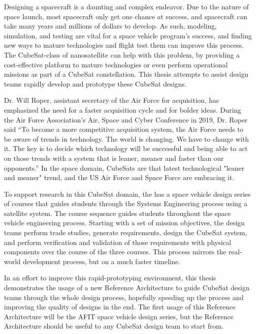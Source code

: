 Designing a spacecraft is a daunting and complex endeavor. Due to the nature of space launch, most spacecraft only get one chance at success, and spacecraft can take many years and millions of dollars to develop. As such, modeling, simulation, and testing are vital for a space vehicle program's success, and finding new ways to mature technologies and flight test them can improve this process. The CubeSat-class of nanosatellite can help with this problem, by providing a cost-effective platform to mature technologies or even perform operational missions as part of a CubeSat constellation. This thesis attempts to assist design teams rapidly develop and prototype these CubeSat designs. 

Dr. Will Roper, assistant secretary of the Air Force for acquisition, has emphasized the need for a faster acquisition cycle and for bolder ideas. During the Air Force Association’s Air, Space and Cyber Conference in 2019, Dr. Roper said “To become a more competitive acquisition system, the Air Force needs to be aware of trends in technology. The world is changing. We have to change with it. The key is to decide which technology will be successful and being able to act on those trends with a system that is leaner, meaner and faster than our opponents.” \citep{Roper2019} In the space domain, CubeSats are that latest technological "leaner and meaner" trend, and the US Air Force and Space Force are embracing it.

To support research in this CubeSat domain, the  has a space vehicle design series of courses that guides students through the Systems Engineering process using a satellite system. The course sequence guides students throughout the space vehicle engineering process. Starting with a set of mission objectives, the design teams perform trade studies, generate requirements, design the CubeSat system, and perform verification and validation of those requirements with physical components over the course of the three courses. This process mirrors the real-world development process, but on a much faster timeline. 

In an effort to improve this rapid-prototyping environment, this thesis demonstrates the usage of a new Reference Architecture to guide CubeSat design teams through the whole design process, hopefully speeding up the process and improving the quality of designs in the end. The first usage of this Reference Architecture will be the AFIT space vehicle design series, but the Reference Architecture should be useful to any CubeSat design team to start from. 

